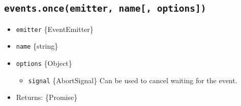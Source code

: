 \begin{Shaded}
\begin{Highlighting}[]
\OperatorTok{,}\OperatorTok{,} \NormalTok{ \} }\OperatorTok{=} \NormalTok{(}\NormalTok{)}\OperatorTok{;}

\NormalTok{\{}
  \OperatorTok{=}  \NormalTok{()}\OperatorTok{;}
  \NormalTok{(}\OperatorTok{;} 
  \NormalTok{(}\OperatorTok{,}\OperatorTok{;}
  \NormalTok{(}\OperatorTok{;} 
\NormalTok{\}}
\NormalTok{\{}
  \OperatorTok{=}  \NormalTok{()}\OperatorTok{;}
  \NormalTok{(}\OperatorTok{;} 
  \NormalTok{(}\OperatorTok{,}\OperatorTok{;}
  \NormalTok{(}\OperatorTok{;} 
\NormalTok{\}}
\end{Highlighting}
\end{Shaded}

\subsection{\texorpdfstring{\texttt{events.once(emitter,\ name{[},\ options{]})}}{events.once(emitter, name{[}, options{]})}}\label{events.onceemitter-name-options}

\begin{itemize}
\tightlist
\item
  \texttt{emitter} \{EventEmitter\}
\item
  \texttt{name} \{string\}
\item
  \texttt{options} \{Object\}

  \begin{itemize}
  \tightlist
  \item
    \texttt{signal} \{AbortSignal\} Can be used to cancel waiting for
    the event.
  \end{itemize}
\item
  Returns: \{Promise\}
\end{itemize}

